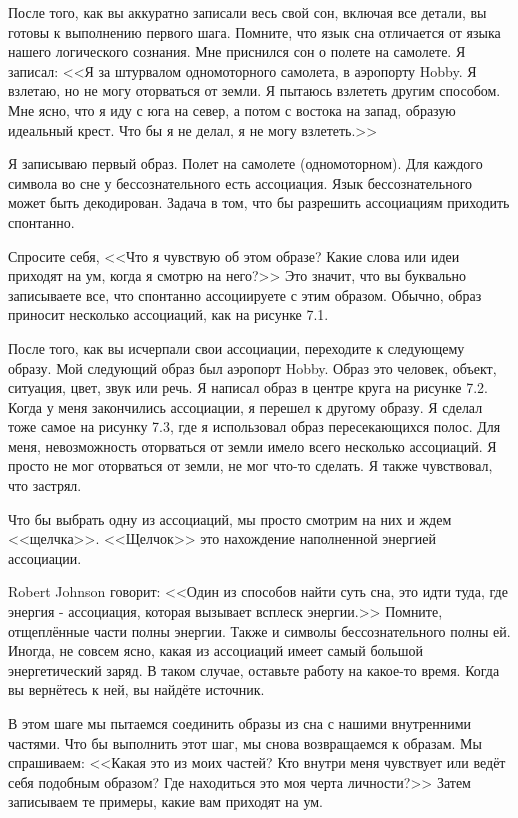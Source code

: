 \documentclass[10pt, fleqn]{article}
\begin{document}

После того, как вы аккуратно записали весь свой сон, включая все детали, вы готовы к выполнению первого шага. Помните, что язык сна отличается от языка нашего логического сознания. Мне приснился сон о полете на самолете. Я записал:
<<Я за штурвалом одномоторного самолета, в аэропорту Hobby. Я взлетаю, но не могу оторваться от земли. Я пытаюсь взлететь другим способом. Мне ясно, что я иду с юга на север, а потом с востока на запад, образую идеальный крест. Что бы я не делал, я не могу взлететь.>>

Я записываю первый образ. Полет на самолете (одномоторном). Для каждого символа во сне у бессознательного есть ассоциация. Язык бессознательного может быть декодирован. Задача в том, что бы разрешить ассоциациям приходить спонтанно.

Спросите себя, <<Что я чувствую об этом образе? Какие слова или идеи приходят на ум, когда я смотрю на него?>> Это значит, что вы буквально записываете все, что спонтанно ассоциируете с этим образом. Обычно, образ приносит несколько ассоциаций, как на рисунке 7.1.

После того, как вы исчерпали свои ассоциации, переходите к следующему образу. Мой следующий образ был аэропорт Hobby. Образ это человек, объект, ситуация, цвет, звук или речь. Я написал образ в центре круга на рисунке 7.2. Когда у меня закончились ассоциации, я перешел к другому образу. Я сделал тоже самое на рисунку 7.3, где я использовал образ пересекающихся полос. Для меня, невозможность оторваться от земли имело всего несколько ассоциаций. Я просто не мог оторваться от земли, не мог что-то сделать. Я также чувствовал, что застрял.

Что бы выбрать одну из ассоциаций, мы просто смотрим на них и ждем <<щелчка>>. <<Щелчок>> это нахождение наполненной энергией ассоциации.

Robert Johnson говорит: <<Один из способов найти суть сна, это идти туда, где энергия - ассоциация, которая вызывает всплеск энергии.>> Помните, отщеплённые части полны энергии. Также и символы бессознательного полны ей. Иногда, не совсем ясно, какая из ассоциаций имеет самый большой энергетический заряд. В таком случае, оставьте работу на какое-то время. Когда вы вернётесь к ней, вы найдёте источник.



В этом шаге мы пытаемся соединить образы из сна с нашими внутренними частями. Что бы выполнить этот шаг, мы снова возвращаемся к образам. Мы спрашиваем: <<Какая это из моих частей? Кто внутри меня чувствует или ведёт себя подобным образом? Где находиться это моя черта личности?>> Затем записываем те примеры, какие вам приходят на ум.
\end{document}
